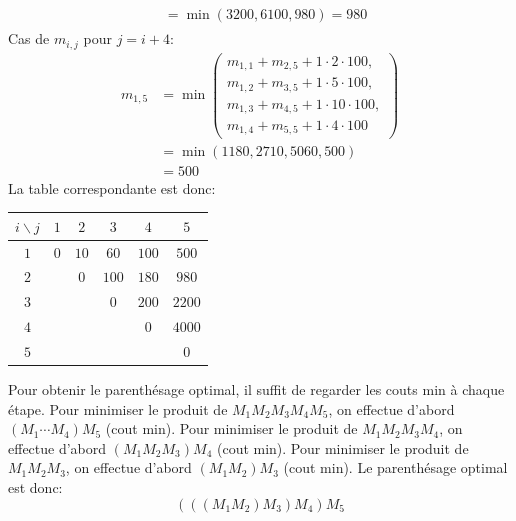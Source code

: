 {\begin{td-sol}[]
\begin{enumerate}
\begin{equation*}
\begin{aligned}
\begin{aligned}
						&= \min(3200, 6100, 980) = 980
					\end{aligned}
				\end{aligned}
			\end{equation*}
			Cas de \(m_{i, j}\) pour \(j = i + 4\):
			\begin{equation*}
				\begin{aligned}
					m_{1, 5} 
					&= \min\left(
						\begin{aligned}
							m_{1, 1} + m_{2, 5} + 1 \cdot 2 \cdot 100, \\
							m_{1, 2} + m_{3, 5} + 1 \cdot 5 \cdot 100, \\
							m_{1, 3} + m_{4, 5} + 1 \cdot 10 \cdot 100, \\
							m_{1, 4} + m_{5, 5} + 1 \cdot 4 \cdot 100 
						\end{aligned}\right)\\
					&= \min(1180, 2710, 5060, 500) \\
					&= 500
				\end{aligned}
			\end{equation*}
			La table correspondante est donc:
			\begin{center}
				\begin{tabular}{c|ccccc}
					\(i \backslash j\) & \(1\) & \(2\) & \(3\) & \(4\) & \(5\) \\
					\hline
					\(1\) & \(0\) & \(10\) & \(60\) & \(100\) & \(500\) \\
					\(2\) &  & \(0\) & \(100\) & \(180\) & \(980\) \\
					\(3\) &  &  & \(0\) & \(200\) & \(2200\) \\
					\(4\) &  &  &  & \(0\) & \(4000\) \\
					\(5\) &  &  &  &  & \(0\)
				\end{tabular}
			\end{center}
			Pour obtenir le parenthésage optimal, il suffit de regarder les couts min à chaque étape.
			Pour minimiser le produit de \(M_1 M_2 M_3 M_4 M_5\), on effectue d'abord \((M_1 \cdots M_4) M_5\) (cout min).
			Pour minimiser le produit de \(M_1 M_2 M_3 M_4\), on effectue d'abord \((M_1 M_2 M_3) M_4\) (cout min).
			Pour minimiser le produit de \(M_1 M_2 M_3\), on effectue d'abord \((M_1 M_2) M_3\) (cout min).
			Le parenthésage optimal est donc:
			\begin{equation*}
				\left(
					\left(
						\left(
							M_1 M_2
						\right) M_3
					\right) M_4
				\right) M_5
			\end{equation*}
		\end{enumerate}
	\end{td-sol}
}{}
